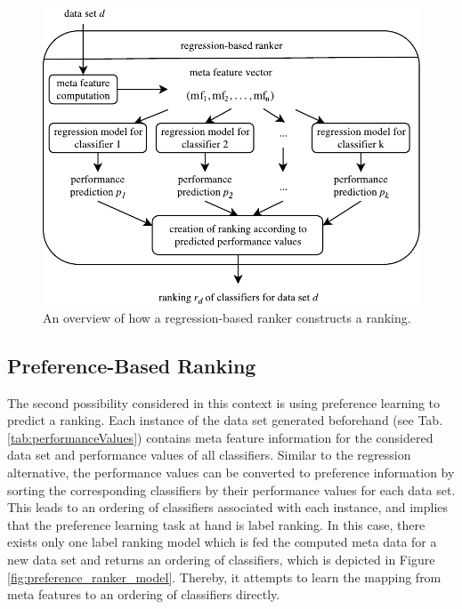 \begin{figure}
\centering
\includegraphics[scale=1]{gfx/regression_models.pdf}
\caption{An overview of how a regression-based ranker constructs a ranking.}
\label{fig:regression_ranker_model}
\end{figure}

\subsection{Preference-Based Ranking}
The second possibility considered in this context is using preference learning to predict a ranking. Each instance of the data set generated beforehand (see Tab. \ref{tab:performanceValues}) contains meta feature information for the considered data set and performance values of all classifiers. Similar to the regression alternative, the performance values can be converted to preference information by sorting the corresponding classifiers by their performance values for each data set. This leads to an ordering of classifiers associated with each instance, and implies that the preference learning task at hand is label ranking. In this case, there exists only one label ranking model which is fed the computed meta data for a new data set and returns an ordering of classifiers, which is depicted in Figure \ref{fig:preference_ranker_model}. Thereby, it attempts to learn the mapping from meta features to an ordering of classifiers directly.

